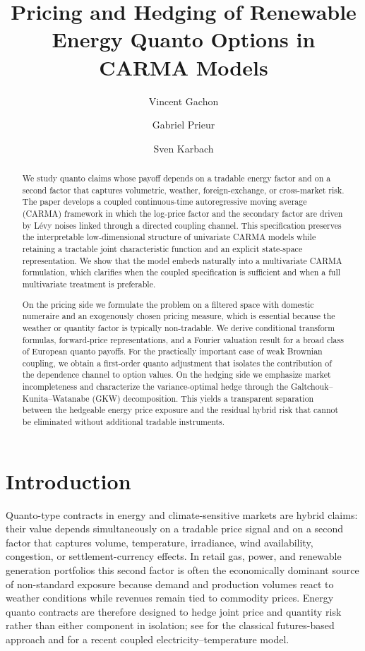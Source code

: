 \documentclass[10pt,reqno]{amsart}
\title[Pricing and Hedging of Quantos in CARMA Models]{Pricing and Hedging of Renewable Energy Quanto Options in CARMA Models}
\author{Vincent Gachon}
\author{Gabriel Prieur}
\author{Sven Karbach}
\newcommand{\1}{\mathbbm{1}}
\begin{document}
\begin{abstract}
We study quanto claims whose payoff depends on a tradable energy factor and on a
second factor that captures volumetric, weather, foreign-exchange, or
cross-market risk. The paper develops a coupled continuous-time autoregressive
moving average (CARMA) framework in which the log-price factor and the secondary
factor are driven by Lévy noises linked through a directed coupling channel.
This specification preserves the interpretable low-dimensional structure of
univariate CARMA models while retaining a tractable joint characteristic
function and an explicit state-space representation. We show that the model
embeds naturally into a multivariate CARMA formulation, which clarifies when
the coupled specification is sufficient and when a full multivariate treatment
is preferable.

On the pricing side we formulate the problem on a filtered space with domestic
numeraire and an exogenously chosen pricing measure, which is essential because
the weather or quantity factor is typically non-tradable. We derive conditional
transform formulas, forward-price representations, and a Fourier valuation
result for a broad class of European quanto payoffs. For the practically
important case of weak Brownian coupling, we obtain a first-order quanto
adjustment that isolates the contribution of the dependence channel to option
values. On the hedging side we emphasize market incompleteness and characterize
the variance-optimal hedge through the Galtchouk--Kunita--Watanabe (GKW)
decomposition. This yields a transparent separation between the hedgeable energy
price exposure and the residual hybrid risk that cannot be eliminated without
additional tradable instruments.
\end{abstract}

\maketitle

\section{Introduction}\label{sec:introduction}

Quanto-type contracts in energy and climate-sensitive markets are hybrid claims:
their value depends simultaneously on a tradable price signal and on a second
factor that captures volume, temperature, irradiance, wind availability,
congestion, or settlement-currency effects. In retail gas, power, and renewable
generation portfolios this second factor is often the economically dominant
source of non-standard exposure because demand and production volumes react to
weather conditions while revenues remain tied to commodity prices. Energy quanto
contracts are therefore designed to hedge joint price and quantity risk rather
than either component in isolation; see \citet{Ben15} for the classical
futures-based approach and \citet{Alf24} for a recent coupled
electricity--temperature model.
\end{document}
